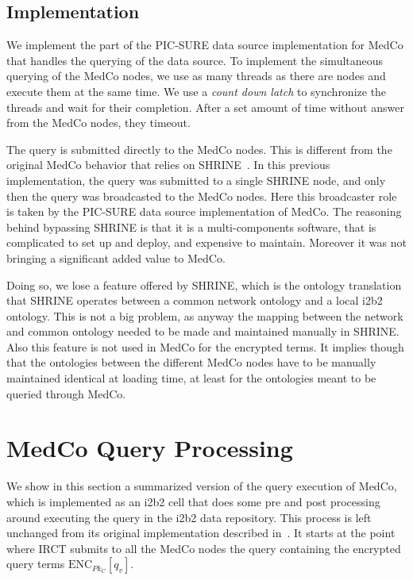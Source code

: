 \subsection{Implementation}

We implement the part of the PIC-SURE data source implementation for MedCo that handles the querying of the data source.
To implement the simultaneous querying of the MedCo nodes, we use as many threads as there are nodes and execute them at the same time. 
We use a \emph{count down latch} to synchronize the threads and wait for their completion.
After a set amount of time without answer from the MedCo nodes, they timeout.

The query is submitted directly to the MedCo nodes. 
This is different from the original MedCo behavior that relies on SHRINE~\cite{shrine}.
In this previous implementation, the query was submitted to a single SHRINE node, and only then the query was broadcasted to the MedCo nodes.
Here this broadcaster role is taken by the PIC-SURE data source implementation of MedCo.
The reasoning behind bypassing SHRINE is that it is a multi-components software, that is complicated to set up and deploy, and expensive to maintain.
Moreover it was not bringing a significant added value to MedCo.

Doing so, we lose a feature offered by SHRINE, which is the ontology translation that SHRINE operates between a common network ontology and a local i2b2 ontology.
This is not a big problem, as anyway the mapping between the network and common ontology needed to be made and maintained manually in SHRINE.
Also this feature is not used in MedCo for the encrypted terms.
It implies though that the ontologies between the different MedCo nodes have to be manually maintained identical at loading time, at least for the ontologies meant to be queried through MedCo.


\section{MedCo Query Processing}
\label{sec:medco-query}

We show in this section a summarized version of the query execution of MedCo, which is implemented as an i2b2 cell that does some pre and post processing around executing the query in the i2b2 data repository.
This process is left unchanged from its original implementation described in~\cite{medco}.
It starts at the point where IRCT submits to all the MedCo nodes the query containing the encrypted query terms $\text{ENC}_{Pk_C}[q_v]$.

